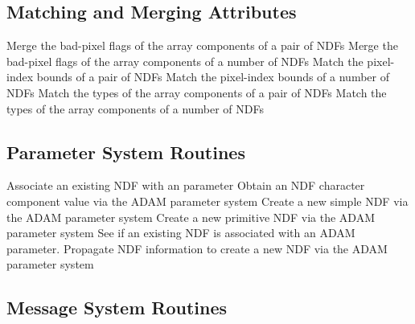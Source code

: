 \subsection{Matching and Merging Attributes}

            {Merge the bad-pixel flags of the array components of a pair of NDFs}
            {Merge the bad-pixel flags of the array components of a number of NDFs}
            {Match the pixel-index bounds of a pair of NDFs}
            {Match the pixel-index bounds of a number of NDFs}
            {Match the types of the array components of a pair of NDFs}
            {Match the types of the array components of a number of NDFs}

\subsection{\label{ss:adamroutinelist}Parameter System Routines}

            {Associate an existing NDF with an  parameter}
            {Obtain an NDF character component value via the ADAM parameter system}
            {Create a new simple NDF via the ADAM parameter system}
            {Create a new primitive NDF via the ADAM parameter system}
            {See if an existing NDF is associated with an ADAM parameter.}
            {Propagate NDF information to create a new NDF via the ADAM parameter system}

\subsection{Message System Routines}

